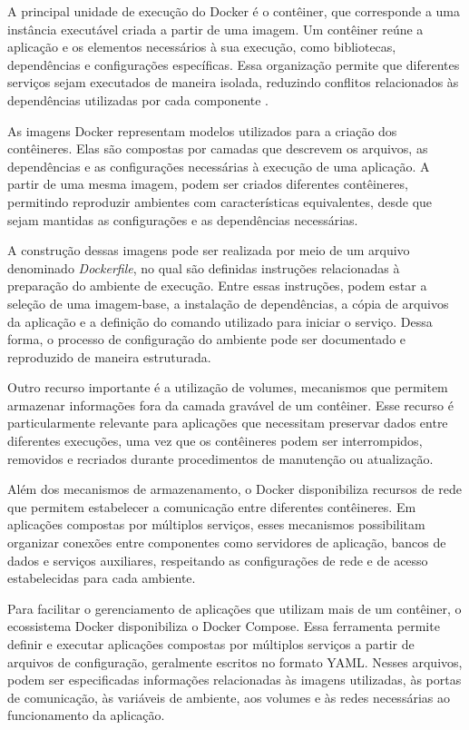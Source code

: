 A principal unidade de execução do Docker é o contêiner, que corresponde a uma instância executável criada a partir de uma imagem. Um contêiner reúne a aplicação e os elementos necessários à sua execução, como bibliotecas, dependências e configurações específicas. Essa organização permite que diferentes serviços sejam executados de maneira isolada, reduzindo conflitos relacionados às dependências utilizadas por cada componente \cite{docker_overview_2026}.

As imagens Docker representam modelos utilizados para a criação dos contêineres. Elas são compostas por camadas que descrevem os arquivos, as dependências e as configurações necessárias à execução de uma aplicação. A partir de uma mesma imagem, podem ser criados diferentes contêineres, permitindo reproduzir ambientes com características equivalentes, desde que sejam mantidas as configurações e as dependências necessárias.

A construção dessas imagens pode ser realizada por meio de um arquivo denominado \textit{Dockerfile}, no qual são definidas instruções relacionadas à preparação do ambiente de execução. Entre essas instruções, podem estar a seleção de uma imagem-base, a instalação de dependências, a cópia de arquivos da aplicação e a definição do comando utilizado para iniciar o serviço. Dessa forma, o processo de configuração do ambiente pode ser documentado e reproduzido de maneira estruturada.

Outro recurso importante é a utilização de volumes, mecanismos que permitem armazenar informações fora da camada gravável de um contêiner. Esse recurso é particularmente relevante para aplicações que necessitam preservar dados entre diferentes execuções, uma vez que os contêineres podem ser interrompidos, removidos e recriados durante procedimentos de manutenção ou atualização.

Além dos mecanismos de armazenamento, o Docker disponibiliza recursos de rede que permitem estabelecer a comunicação entre diferentes contêineres. Em aplicações compostas por múltiplos serviços, esses mecanismos possibilitam organizar conexões entre componentes como servidores de aplicação, bancos de dados e serviços auxiliares, respeitando as configurações de rede e de acesso estabelecidas para cada ambiente.

Para facilitar o gerenciamento de aplicações que utilizam mais de um contêiner, o ecossistema Docker disponibiliza o Docker Compose. Essa ferramenta permite definir e executar aplicações compostas por múltiplos serviços a partir de arquivos de configuração, geralmente escritos no formato YAML. Nesses arquivos, podem ser especificadas informações relacionadas às imagens utilizadas, às portas de comunicação, às variáveis de ambiente, aos volumes e às redes necessárias ao funcionamento da aplicação.

